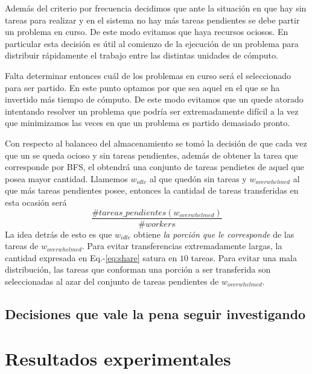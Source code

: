 Además del criterio por frecuencia decidimos que ante la situación en que hay
\ws sin tareas para realizar y en el sistema no hay más tareas pendientes se
debe partir un problema en curso. De este modo evitamos que haya recursos
ociosos. En particular esta decisión es útil al comienzo de la ejecución de un
problema para distribuir rápidamente el trabajo entre las distintas unidades
de cómputo.

Falta determinar entonces cuál de los problemas en curso será el seleccionado
para ser partido. En este punto optamos por que sea aquel en el que se ha
invertido más tiempo de cómputo. De este modo evitamos que un \w quede atorado
intentando resolver un problema que podría ser extremadamente difícil a la vez
que minimizamos las veces en que un problema es partido demasiado pronto.

Con respecto al balanceo del almacenamiento se tomó la decisión de que cada
vez que un \w se queda ocioso y sin tareas pendientes, además de obtener la
tarea que corresponde por BFS, el \w obtendrá una conjunto de tareas pendietes
de aquel \w que posea mayor cantidad. Llamemos $w_{idle}$ al \w que quedón sin
tareas y $w_{overwhelmed}$ al que más tareas pendientes posee, entonces la
cantidad de tareas transferidas en esta ocasión será \begin{equation}
\frac{\#tareas\_pendientes(w_{overwhelmed})}{\# workers}
\label{eq:share}\end{equation} La idea detrás de esto es que $w_{idle}$
obtiene \emph{la porción que le corresponde} de las tareas de
$w_{overwhelmed}$. Para evitar transferencias extremadamente largas, la
cantidad expresada en Eq.-\ref{eq:share} satura en $10$ tareas. Para evitar
una mala distribución, las tareas que conforman una porción a ser transferida
son seleccionadas al azar del conjunto de tareas pendientes de
$w_{overwhelmed}$.

\subsection{Decisiones que vale la pena seguir investigando}

\section{Resultados experimentales}

